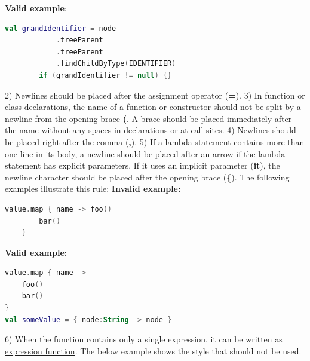 \textbf{Valid example}: 
\begin{lstlisting}[language=Kotlin]
        val grandIdentifier = node
            .treeParent
            .treeParent
            .findChildByType(IDENTIFIER)
        if (grandIdentifier != null) {}
\end{lstlisting}
  
2)	Newlines should be placed after the assignment operator (\textbf{=}).
3)	In function or class declarations, the name of a function or constructor should not be split by a newline from the opening brace \textbf{(}.
    A brace should be placed immediately after the name without any spaces in declarations or at call sites.
4)	Newlines should be placed right after the comma (\textbf{,}).
5)	If a lambda statement contains more than one line in its body, a newline should be placed after an arrow if the lambda statement has explicit parameters.
    If it uses an implicit parameter (\textbf{it}), the newline character should be placed after the opening brace (\textbf{\{}). 
    The following examples illustrate this rule:
\textbf{Invalid example:}
\begin{lstlisting}[language=Kotlin]
    value.map { name -> foo()
        bar()
    }
\end{lstlisting}
\textbf{Valid example:} 
\begin{lstlisting}[language=Kotlin]
value.map { name ->
    foo()
    bar()
}
val someValue = { node:String -> node }
\end{lstlisting}
6) When the function contains only a single expression, it can be written as \href{https://kotlinlang.org/docs/reference/functions.html#single-expression-functions}{expression function}. 
   The below example shows the style that should not be used.
   
